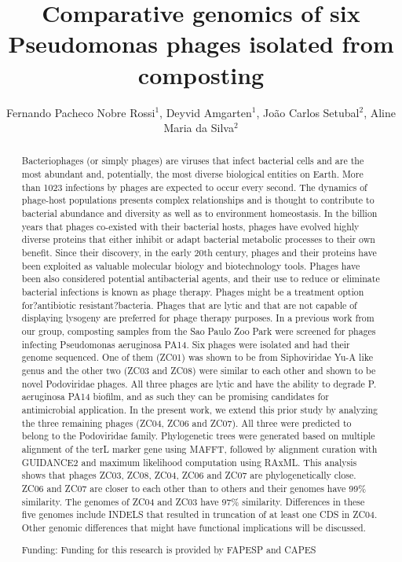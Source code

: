 \documentclass[twoside]{article}
\title{\vspace{-15mm}\fontsize{24pt}{10pt}\selectfont\textbf{Comparative genomics of six Pseudomonas phages isolated from composting}} %
\author{Fernando Pacheco Nobre Rossi$^1$, Deyvid Amgarten$^1$, Jo\~ao Carlos Setubal$^2$, Aline Maria da Silva$^2$}
\affil{1 USP - DEPARTAMENTO DE QUIMICA\\ 2 USP\\ }
\date{}
\begin{document}
\maketitle %

\thispagestyle{fancy} %


\begin{abstract}
Bacteriophages (or simply phages) are viruses that infect bacterial cells and are the most abundant and, potentially, the most diverse biological entities on Earth. More than 1023 infections by phages are expected to occur every second. The dynamics of phage-host populations presents complex relationships and is thought to contribute to bacterial abundance and diversity as well as to environment homeostasis. In the billion years that phages co-existed with their bacterial hosts, phages have evolved highly diverse proteins that either inhibit or adapt bacterial metabolic processes to their own benefit. Since their discovery, in the early 20th century, phages and their proteins have been exploited as valuable molecular biology and biotechnology tools. Phages have been also considered potential antibacterial agents, and their use to reduce or eliminate bacterial infections is known as phage therapy. Phages might be a treatment option for?antibiotic resistant?bacteria. Phages that are lytic and that are not capable of displaying lysogeny are preferred for phage therapy purposes. In a previous work from our group, composting samples from the Sao Paulo Zoo Park were screened for phages infecting Pseudomonas aeruginosa PA14. Six phages were isolated and had their genome sequenced. One of them (ZC01) was shown to be from Siphoviridae Yu-A like genus and the other two (ZC03 and ZC08) were similar to each other and shown to be novel Podoviridae phages. All three phages are lytic and have the ability to degrade P. aeruginosa PA14 biofilm, and as such they can be promising candidates for antimicrobial application. In the present work, we extend this prior study by analyzing the three remaining phages (ZC04, ZC06 and ZC07). All three were predicted to belong to the Podoviridae family. Phylogenetic trees were generated based on multiple alignment of the terL marker gene using MAFFT, followed by alignment curation with GUIDANCE2 and maximum likelihood computation using RAxML. This analysis shows that phages ZC03, ZC08, ZC04, ZC06 and ZC07 are phylogenetically close. ZC06 and ZC07 are closer to each other than to others and their genomes have 99\% similarity. The genomes of ZC04 and ZC03 have 97\% similarity. Differences in these five genomes include INDELS that resulted in truncation of at least one CDS in ZC04. Other genomic differences that might have functional implications will be discussed.

Funding: Funding for this research is provided by FAPESP and CAPES
\end{abstract}
\end{document}
